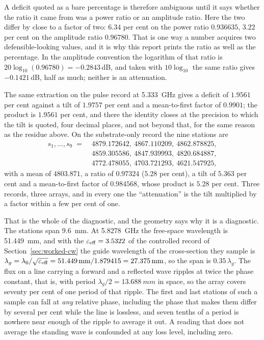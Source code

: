 A deficit quoted as a bare percentage is therefore ambiguous until it says whether the ratio it came from was a
power ratio or an amplitude ratio. Here the two differ by close to a factor of two: $6.34$ per cent on the power
ratio $0.936635$, $3.22$ per cent on the amplitude ratio $0.96780$. That is one way a number acquires two
defensible-looking values, and it is why this report prints the ratio as well as the percentage. In the
amplitude convention the logarithm of that ratio is $20\log_{10}(0.96780) = -0.2843$\,dB, and taken with
$10\log_{10}$ the same ratio gives $-0.1421$\,dB, half as much; neither is an attenuation.

The same extraction on the pulse record at \SI{5.333}{\giga\hertz} gives a deficit of $1.9561$ per cent against a
tilt of $1.9757$ per cent and a mean-to-first factor of $0.9901$; the product is $1.9561$ per cent, and there the
identity closes at the precision to which the tilt is quoted, four decimal places, and not beyond that, for the
same reason as the residue above. On the substrate-only record the nine stations are
\begin{equation*}
  \begin{aligned}
    s_1, \dots, s_9 \;=\; {} & 4879.172642,\ 4867.110209,\ 4862.878825, \\
    & 4859.305586,\ 4847.939993,\ 4820.684887, \\
    & 4772.478055,\ 4703.721293,\ 4621.547925 ,
  \end{aligned}
\end{equation*}
with a mean of $4803.871$, a ratio of $0.97324$ ($5.28$ per cent), a tilt of $5.363$ per cent and a
mean-to-first factor of $0.984568$, whose product is $5.28$ per cent. Three records, three arrays, and in every
one the ``attenuation'' is the tilt multiplied by a factor within a few per cent of one.

That is the whole of the diagnostic, and the geometry says why it is a diagnostic. The stations span
\SI{9.6}{mm}. At \SI{5.8278}{\giga\hertz} the free-space wavelength is \SI{51.449}{mm}, and with the
$\varepsilon_{\mathrm{eff}} = 3.5322$ of the controlled record of Section~\ref{sec:worked-cw} the guide wavelength of
the cross-section they sample is $\lambda_g = \lambda_0/\sqrt{\varepsilon_{\mathrm{eff}}} =
\SI{51.449}{mm}/1.879415 = \SI{27.375}{mm}$, so the span is $0.35\,\lambda_g$. The flux on a line carrying a
forward and a reflected wave ripples at twice the phase constant, that is, with period
$\lambda_g/2 = \SI{13.688}{mm}$ in space, so the array covers seventy per cent of one period of that ripple. The
first and last stations of such a sample can fall at \emph{any} relative phase, including the phase that makes
them differ by several per cent while the line is lossless, and seven tenths of a period is nowhere near enough
of the ripple to average it out. A reading that does not average the standing wave is confounded at any loss
level, including zero.


